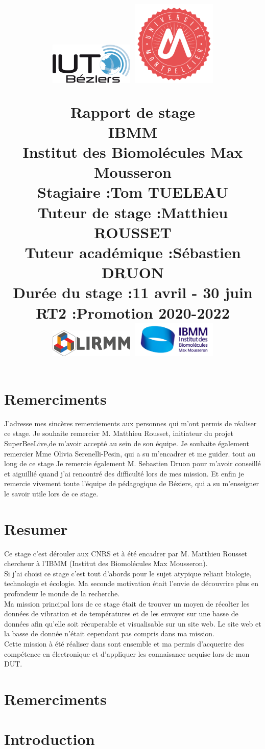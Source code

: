 \documentclass[12pt,french,a4paper]{article}
\title{
	\bigskip
 \centering
         \includegraphics[width=4cm]{../../../logo/IUTlogo.png}  \hspace{7cm}
         \includegraphics[width=4cm]{../../../logo/UMlogo.png}  \hspace{7cm}

	\LARGE{Rapport de stage}
	\\
	\LARGE{IBMM}
	\\
	\large{\textbf{Institut des Biomolécules Max Mousseron}}
	\\
	\large{Stagiaire :\textbf{Tom TUELEAU}}
	\\
	\large{Tuteur de stage :\textbf{Matthieu ROUSSET}}
	\\
	\large{Tuteur académique :\textbf{Sébastien DRUON}}
	\\
	\large{Durée du stage :\textbf{11 avril - 30 juin}}
	\\
	\large{RT2 :Promotion 2020-2022}
	\\
         \includegraphics[width=4cm]{../../../logo/LIRMMlogo.png}  \hspace{7cm}
         \includegraphics[width=4cm]{../../../logo/IBMMlogo.jpg}  \hspace{7cm}
}
\author{
	\date{}
}
\begin{document}
\maketitle

\newpage
\section*{Remerciments}
J’adresse mes sincères remerciements aux personnes qui m’ont permis de réaliser ce stage.
Je souhaite remercier M. Matthieu Rousset, initiateur du projet SuperBeeLive,de m’avoir accepté au sein de son équipe.
Je souhaite également remercier Mme Olivia Serenelli-Pesin, qui a su m’encadrer et me guider. tout au long de ce stage
Je remercie également M. Sebastien Druon pour m’avoir conseillé et aiguillié quand j'ai rencontré des difficulté lors de mes mission.
Et enfin je remercie vivement toute l’équipe de pédagogique de Béziers, qui a su m'enseigner le savoir utile lors de ce stage.
\newpage

\section*{Resumer}
Ce stage c'est dérouler aux CNRS et à été encadrer par M. Matthieu Rousset chercheur à l'IBMM (Institut des Biomolécules Max Mousseron). \\
Si j'ai choisi ce stage c'est tout d'abords pour le sujet atypique reliant biologie, technologie et écologie. Ma seconde motivation était l'envie de découvrire plus en profondeur le monde de la recherche.\\ 
Ma mission principal lors de ce stage était de trouver un moyen de récolter les données de vibration et de températures et de les envoyer sur une basse de données afin qu'elle soit récuperable et visualisable sur un site web. Le site web et la basse de donnée n'était cependant pas compris dans ma mission. \\
Cette mission à été réaliser dans sont ensemble et ma permis d'acquerire des compétence en électronique et d'appliquer les connaisance acquise lors de mon DUT. 
\newpage
\section*{Remerciments}
\tableofcontents

\newpage
\section{Introduction}
\end{document}
